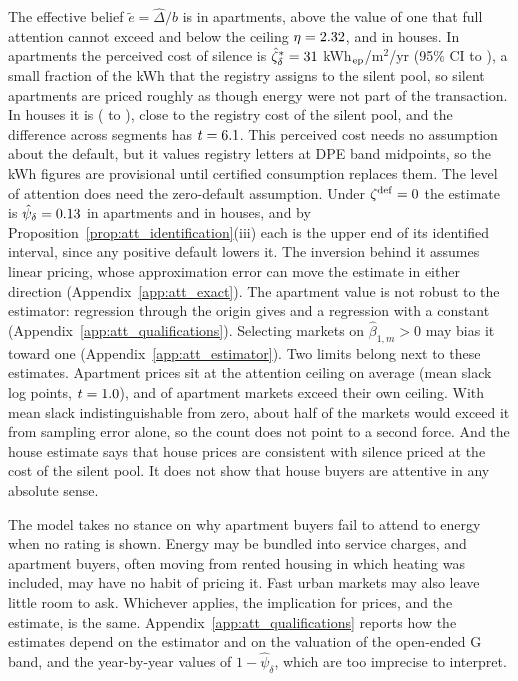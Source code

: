The effective belief $\tilde e=\hat\Delta/\hat b$ is \attRatioApt{} in apartments, above the value of one that full attention cannot exceed and below the ceiling $\eta=2.32{}$, and \attRatioHouse{} in houses. In apartments the perceived cost of silence is $\hat\zeta^*_\delta=31{}$ kWh$_{\rm ep}$/m$^2$/yr (95\% CI \attCstarLoApt{} to \attCstarHiApt{}), a small fraction of the \attCsilApt{} kWh that the registry assigns to the silent pool, so silent apartments are priced roughly as though energy were not part of the transaction. In houses it is \attCstarHouse{} (\attCstarLoHouse{} to \attCstarHiHouse{}), close to the registry cost of the silent pool, and the difference across segments has $t=6.1$. This perceived cost needs no assumption about the default, but it values registry letters at DPE band midpoints, so the kWh figures are provisional until certified consumption replaces them. The level of attention does need the zero-default assumption. Under $\zeta^{\rm def}=0$ the estimate is $\hat\psi_\delta=0.13{}$ in apartments and \attPsiHouse{} in houses, and by Proposition~\ref{prop:att_identification}(iii) each is the upper end of its identified interval, since any positive default lowers it. The inversion behind it assumes linear pricing, whose approximation error can move the estimate in either direction (Appendix~\ref{app:att_exact}). The apartment value is not robust to the estimator: regression through the origin gives \attPsiOLSApt{} and a regression with a constant \attPsiConstApt{} (Appendix~\ref{app:att_qualifications}). Selecting markets on $\hat\beta_{1,m}>0$ may bias it toward one (Appendix~\ref{app:att_estimator}). Two limits belong next to these estimates. Apartment prices sit at the attention ceiling on average (mean slack \attSlackApt{} log points, $t=1.0$), and \attNViolApt{} of \attNMarketsApt{} apartment markets exceed their own ceiling. With mean slack indistinguishable from zero, about half of the markets would exceed it from sampling error alone, so the count does not point to a second force. And the house estimate says that house prices are consistent with silence priced at the cost of the silent pool. It does not show that house buyers are attentive in any absolute sense.

The model takes no stance on why apartment buyers fail to attend to energy when no rating is shown. Energy may be bundled into service charges, and apartment buyers, often moving from rented housing in which heating was included, may have no habit of pricing it. Fast urban markets may also leave little room to ask. Whichever applies, the implication for prices, and the estimate, is the same. Appendix~\ref{app:att_qualifications} reports how the estimates depend on the estimator and on the valuation of the open-ended G band, and the year-by-year values of $1-\hat\psi_\delta$, which are too imprecise to interpret.


